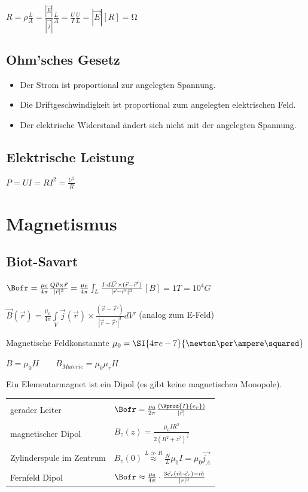 \documentclass[10pt,a4paper]{scrartcl}
\begin{document}
\begin{multicols*}{3}
	$R = \rho\frac{L}{A}=\frac{|\vec{E}|}{|\vec{j}|}\frac{L}{A}=\frac{U}{I}$\hfill$\frac{U}{L}=|\vec{E}|$\hfill$[R]=\si{\ohm}$
	
	\subsection{Ohm'sches Gesetz}
	
	\begin{itemize}
	\compaq
	\item
	Der Strom ist proportional zur angelegten Spannung.
	\item
	Die Driftgeschwindigkeit ist proportional zum angelegten elektrischen Feld.
	\item
	Der elektrische Widerstand ändert sich nicht mit der angelegten Spannung.
	\end{itemize}
	
	\subsection*{Elektrische Leistung}
	
	$P=UI=RI^2=\frac{U^2}{R}$
	
	\section{Magnetismus}

	\subsection{Biot-Savart}
	$\Bofr=\frac{\mu_0}{4\pi}\frac{Q\vec{v}\times\vec{r}}{|\vec{r}|^3}=\frac{\mu_0}{4\pi}\int_L{\frac{I\cdot d\vec{L'}\times(\vec{r}-\vec{r}')}{|\vec{r}-\vec{r}'|^3}}$\hfill$[B]=1T=10^4G$
	
	$\vec{B}(\vec{r})=\frac{\mu_0}{4\pi}\int\limits_V\vec{j}(\vec{r})\times\frac{(\vec{r}-\vec{r}')}{|\vec{r}-\vec{r}'|^3}dV'$ (analog zum E-Feld)
	
	Magnetische Feldkonstannte \hfill $\mu_0=\SI{4\pi e-7}{\newton\per\ampere\squared}$
	
	$B=\mu_0H\qquad B_{Materie}=\mu_0\mu_rH$
	
	Ein Elementarmagnet ist ein Dipol (es gibt keine magnetischen Monopole).
	
	\begin{tabulary}{\linewidth}{L|L}
	\hline\\
	gerader Leiter & $\Bofr=\frac{\mu_0}{2\pi}\frac{(\Vprod{I}{e_r})}{|\vec{r}|}$\\
	\hline\\
	magnetischer Dipol &$B_z(z)=\frac{\mu_0IR^2}{2(R^2+z^2)^{\frac{3}{2}}}$\\
	\hline\\
	Zylinderspule im Zentrum &$B_z(0) \overset{L \gg R}{\approx}\frac{N}{L}\mu_0 I=\mu_0 \vec{j_A}$\\
	\hline\\
	Fernfeld Dipol&$\Bofr\approx\frac{\mu_0}{4\pi}\cdot\frac{3\vec{e}_r(\vec{m}\cdot\vec{e}_r)-\vec{m}}{|r|^3}$
	\end{tabulary}
	

\end{multicols*}
\end{document}
